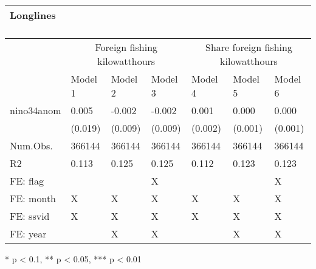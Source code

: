 \captionsetup[table]{labelformat=empty,skip=1pt}
\begin{longtable}{lllllll}
\caption*{
\large Longlines\\ 
\small \\ 
} \\ 
\toprule
& \multicolumn{3}{c}{Foreign fishing kilowatthours} & \multicolumn{3}{c}{Share foreign fishing kilowatthours} \\ 
 \cmidrule(lr){2-4}\cmidrule(lr){5-7}
  & Model 1 & Model 2 & Model 3 & Model 4 & Model 5 & Model 6 \\ 
\midrule
nino34anom & 0.005 & -0.002 & -0.002 & 0.001 & 0.000 & 0.000 \\ 
 & (0.019) & (0.009) & (0.009) & (0.002) & (0.001) & (0.001) \\ 
Num.Obs. & 366144 & 366144 & 366144 & 366144 & 366144 & 366144 \\ 
R2 & 0.113 & 0.125 & 0.125 & 0.112 & 0.123 & 0.123 \\ 
FE:  flag &  &  & X &  &  & X \\ 
FE:  month & X & X & X & X & X & X \\ 
FE:  ssvid & X & X & X & X & X & X \\ 
FE:  year &  & X & X &  & X & X \\ 
\bottomrule
\end{longtable}
\begin{minipage}{\linewidth}
* p < 0.1, ** p < 0.05, *** p < 0.01\\ 
\end{minipage}

